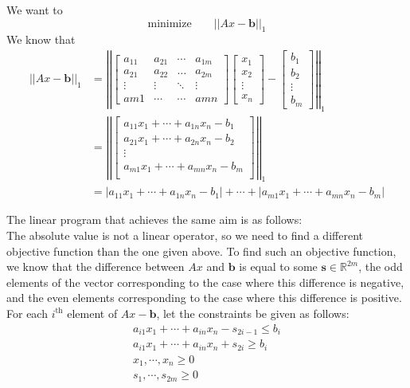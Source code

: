 \documentclass[letterpaper,12pt]{article}
\theoremstyle{definition}
\begin{document}
We want to 
\[\underset{}{\text{minimize}} \qquad ||Ax - \mathbf{b}||_1\]
We know that 
\begin{align*}
||Ax - \mathbf{b}||_1 &= 
\left|\left|
\begin{bmatrix}
    a_{11} & a_{21}& \cdots& a_{1m} \\
    a_{21} & a_{22}& \ldots& a_{2m} \\
    \vdots& \vdots& \ddots & \vdots \\
    a{m1}& \cdots& \cdots & a{mn} 
\end{bmatrix}
\begin{bmatrix}
    x_1\\
    x_2\\
    \vdots\\
    x_n
\end{bmatrix}
-
\begin{bmatrix}
    b_1\\
    b_2\\
    \vdots\\
    b_m
\end{bmatrix}
\right|\right|_1
\\
 &= 
\left|\left|
\begin{bmatrix}
    a_{11}x_1 +  \cdots + a_{1n}x_n -b_1\\
    a_{21}x_1 +  \cdots + a_{2n}x_n -b_2\\
    \vdots\\
    a_{m1}x_1 +  \cdots + a_{mn}x_n -b_m\\
\end{bmatrix}
\right|\right|_1\\
 &= |a_{11}x_1 +  \cdots + a_{1n}x_n -b_1| + \cdots + |a_{m1}x_1 +  \cdots + a_{mn}x_n -b_m|
\end{align*}


The linear program that achieves the same aim is as follows:
\\The absolute value is not a linear operator, so we need to find a different objective function than the one given above. To find such an objective function, we know that the difference between $Ax$ and $\mathbf{b}$ is equal to some $\mathbf{s} \in \mathbb{R}^{2m}$, the odd elements of the vector corresponding to the case where this difference is negative, and the even elements corresponding to the case where this difference is positive. For each $i^\text{th}$ element of $Ax-\mathbf{b}$, let the constraints be given as follows:
\begin{align*}
    a_{i1}x_1 +  \cdots + a_{in}x_n - s_{2i-1} \leq b_i\\
    a_{i1}x_1 +  \cdots + a_{in}x_n + s_{2i} \geq b_i\\
    x_1, \cdots, x_n \geq 0\\
    s_1, \cdots, s_{2m} \geq 0
\end{align*}
\end{document}
